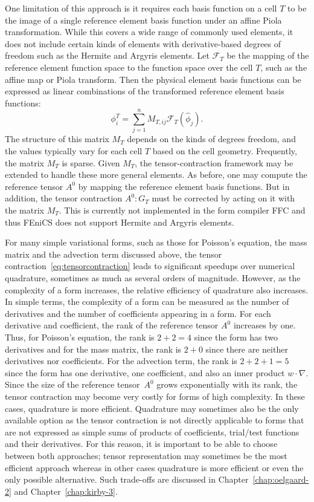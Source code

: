 One limitation of this approach is it requires each basis function on
a cell \( T \) to be the image of a single reference element basis
function under an affine Piola transformation. While this covers a
wide range of commonly used elements, it does not include certain
kinds of elements with derivative-based degrees of freedom such as the
Hermite and Argyris elements. Let \( \mathcal{F}_T \) be the mapping
of the reference element function space to the function space over the
cell $T$, such as the affine map or Piola transform. Then the physical
element basis functions can be expressed as linear combinations of
the transformed reference element basis functions:
\begin{equation}
  \phi^T_i = \sum_{j=1}^n M_{T,{ij}} \mathcal{F}_T \left( \hat{\phi}_j \right).
\end{equation}
The structure of this matrix \( M_T \) depends on the kinds of degrees
freedom, and the values typically vary for each cell \( T \) based on the
cell geometry.  Frequently, the matrix $M_T$ is sparse. Given \( M_T
\), the tensor-contraction framework may be extended to handle these
more general elements.  As before, one may compute the reference
tensor \( A^0 \) by mapping the reference element basis functions. But
in addition, the tensor contraction \( A^0 : G_T \) must be corrected
by acting on it with the matrix \( M_T \). This is currently not
implemented in the form compiler FFC and thus FEniCS does not support
Hermite and Argyris elements.

For many simple variational forms, such as those for Poisson's
equation, the mass matrix and the advection term discussed above, the
tensor contraction~\eqref{eq:tensorcontraction} leads to significant
speedups over numerical quadrature, sometimes as much as several
orders of magnitude.  However, as the complexity of a form increases,
the relative efficiency of quadrature also increases. In simple terms,
the complexity of a form can be measured as the number of derivatives
and the number of coefficients appearing in a form. For each
derivative and coefficient, the rank of the reference tensor $A^0$
increases by one. Thus, for Poisson's equation, the rank is $2 + 2 =
4$ since the form has two derivatives and for the mass matrix, the
rank is $2 + 0$ since there are neither derivatives nor
coefficients. For the advection term, the rank is $2 + 2 + 1 = 5$
since the form has one derivative, one coefficient, and also an inner
product $w \cdot \nabla$. Since the size of the reference tensor~$A^0$
grows exponentially with its rank, the tensor contraction may become
very costly for forms of high complexity. In these cases, quadrature
is more efficient. Quadrature may sometimes also be the only available
option as the tensor contraction is not directly applicable to forms
that are not expressed as simple sums of products of coefficients,
trial/test functions and their derivatives. For this reason, it is
important to be able to choose between both approaches; tensor
representation may sometimes be the most efficient approach whereas in
other cases quadrature is more efficient or even the only possible
alternative.  Such trade-offs are discussed in
Chapter~\ref{chap:oelgaard-2} and Chapter~\ref{chap:kirby-3}.
